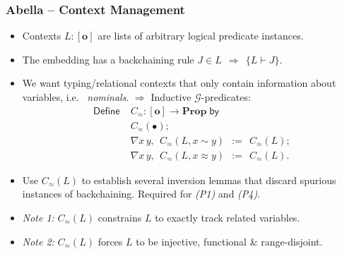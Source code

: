 \documentclass[english,pdftex,dvipsnames,leqno,handout]{beamer}%
\newcommand{\hl}[1]{\emph{\color{sbmcyan} #1}}
\newcommand{\ms}{\;\,}
\newcommand{\mbin}[1]{\mathbin{\ms #1 \ms}}
\newcommand{\mrel}[1]{\mathrel{\ms #1 \ms}} %
\newcommand{\mImpl}{\mrel{\Rightarrow}}
\newcommand{\eqdef}{\mbin{:=}}
\newcommand{\of}{\mathbin{:}}
\newcommand{\tyrel}[2]{\ensuremath{#1 \mathrel{\sim} #2}}
\newcommand{\tmrel}[2]{\ensuremath{#1 \mathrel{\approx} #2}}
\newcommand{\lpProp}{\ensuremath{\mathbf{o}}}
\newcommand{\gProp}{\ensuremath{\mathbf{Prop}}}
\begin{document}
\begin{frame}
  \frametitle{Abella -- Context Management}
  \begin{itemize}
  \item Contexts $L \of [\lpProp]$ are lists of arbitrary logical predicate instances.\pause
  \item The embedding has a backchaining rule \hl{$J \in L \mImpl \{L \vdash J\}$}.\pause
  \item We want typing/relational contexts that only contain information about variables, i.e.\ \hl{nominals}. \pause $\Rightarrow$ Inductive $\mathcal{G}$-predicates:
    {\color{greenblue}\begin{align*}
                        \mathsf{Define}\; &C_\approx \of [\lpProp] \to \gProp\;\mathsf{by}\\
                                          &C_\approx(\bullet);\\
                                          &\nabla x\,y,\ms C_\approx(L, \tyrel{x}{y}) \eqdef C_\approx(L);\\
                                          &\nabla x\,y,\ms C_\approx(L, \tmrel{x}{y}) \eqdef C_\approx(L).
    \end{align*}}\vspace{-1.6em}\pause
    \item Use {\color{greenblue}$C_\approx(L)$} to establish several inversion lemmas that discard spurious instances of backchaining. Required for \hl{(P1)} and \hl{(P4)}.\pause
    \item \hl{Note 1:} {\color{greenblue}$C_\approx(L)$} constrains $L$ to exactly track related variables. \pause
    \item \hl{Note 2:} {\color{greenblue}$C_\approx(L)$} forces $L$ to be injective, functional \& range-disjoint.
  \end{itemize}
\end{frame}
\end{document}
